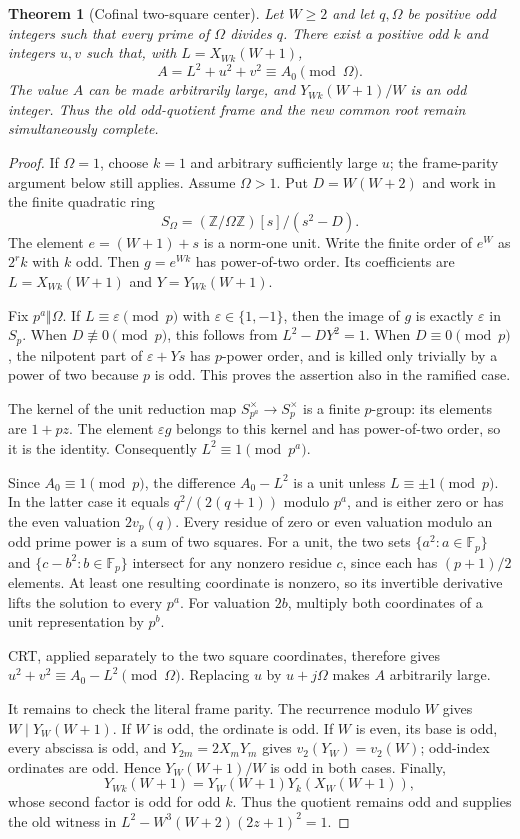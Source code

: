 \documentclass[11pt]{article}
\newtheorem{theorem}{Theorem}[section]
\theoremstyle{remark}\newtheorem{remark}[theorem]{Remark}
\newcommand{\Z}{\mathbb Z}\newcommand{\N}{\mathbb N}
\begin{document}
\begin{theorem}[Cofinal two-square center]\label{thm:two-square}
Let $W\ge2$ and let $q,\Omega$ be positive odd integers such that
every prime of $\Omega$ divides $q$. There exist a positive odd $k$
and integers $u,v$ such that, with $L=X_{Wk}(W+1)$,
\[
 A=L^2+u^2+v^2\equiv A_0\pmod\Omega.
\]
The value $A$ can be made arbitrarily large, and $Y_{Wk}(W+1)/W$
is an odd integer. Thus the old odd-quotient frame and the new common
root remain simultaneously complete.
\end{theorem}
\begin{proof}
If $\Omega=1$, choose $k=1$ and arbitrary sufficiently large $u$;
the frame-parity argument below still applies. Assume $\Omega>1$.
Put $D=W(W+2)$ and work in the finite quadratic ring
\[
 S_\Omega=(\Z/\Omega\Z)[s]/(s^2-D).
\]
The element $e=(W+1)+s$ is a norm-one unit. Write the finite order of
$e^W$ as $2^r k$ with $k$ odd. Then $g=e^{Wk}$ has power-of-two
order. Its coefficients are $L=X_{Wk}(W+1)$ and $Y=Y_{Wk}(W+1)$.

Fix $p^a\Vert\Omega$. If $L\equiv\varepsilon\pmod p$ with
$\varepsilon\in\{1,-1\}$, then the image of $g$ is exactly
$\varepsilon$ in $S_p$. When $D\not\equiv0\pmod p$, this follows
from $L^2-DY^2=1$. When $D\equiv0\pmod p$, the nilpotent part of
$\varepsilon+Ys$ has $p$-power order, and is killed only trivially by
a power of two because $p$ is odd. This proves the assertion also
in the ramified case.

The kernel of the unit reduction map $S_{p^a}^{\times}\to S_p^{\times}$
is a finite $p$-group: its elements are $1+pz$. The element
$\varepsilon g$ belongs to this kernel and has power-of-two order,
so it is the identity. Consequently $L^2\equiv1\pmod{p^a}$.

Since $A_0\equiv1\pmod p$, the difference $A_0-L^2$ is a unit
unless $L\equiv\pm1\pmod p$. In the latter case it equals
$q^2/(2(q+1))$ modulo $p^a$, and is either zero or has the even
valuation $2v_p(q)$. Every residue of zero or even valuation modulo
an odd prime power is a sum of two squares. For a unit, the two
sets $\{a^2:a\in\mathbb F_p\}$ and
$\{c-b^2:b\in\mathbb F_p\}$ intersect for any nonzero residue $c$,
since each has $(p+1)/2$ elements. At least
one resulting coordinate is nonzero, so its invertible derivative
lifts the solution to every $p^a$. For valuation $2b$, multiply
both coordinates of a unit representation by $p^b$.

CRT, applied separately to the two square coordinates, therefore gives
$u^2+v^2\equiv A_0-L^2\pmod\Omega$. Replacing $u$ by
$u+j\Omega$ makes $A$ arbitrarily large.

It remains to check the literal frame parity. The recurrence modulo $W$
gives $W\mid Y_W(W+1)$. If $W$ is odd, the ordinate is odd.
If $W$ is even, its base is odd, every abscissa is odd, and
$Y_{2m}=2X_mY_m$ gives $v_2(Y_W)=v_2(W)$; odd-index ordinates are
odd. Hence $Y_W(W+1)/W$ is odd in both cases. Finally,
\[
 Y_{Wk}(W+1)=Y_W(W+1)Y_k(X_W(W+1)),
\]
whose second factor is odd for odd $k$. Thus the quotient remains
odd and supplies the old witness in
$L^2-W^3(W+2)(2z+1)^2=1$.
\end{proof}
\end{document}
